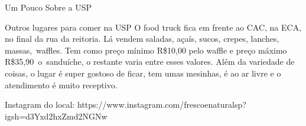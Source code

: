 \begin{secao}{Um Pouco Sobre a USP}
\begin{subsecao}{Outros lugares para comer na USP}
O food truck fica em frente ao CAC, na ECA, no final da rua da reitoria. Lá vendem saladas, 
açaís, sucos, crepes, lanches, massas, waffles. Tem como preço mínimo R\$10,00 pelo waffle e 
preço máximo R\$35,90 o sanduíche, o restante varia entre esses valores. Além da 
variedade de coisas, o lugar é super gostoso de ficar, tem umas mesinhas, é ao ar livre e o 
atendimento é muito receptivo.

Instagram do local: https://www.instagram.com/frescoenaturalsp?igsh=d3Yxd2hxZmd2NGNw


\pagebreak
\end{subsecao}

\end{secao}
